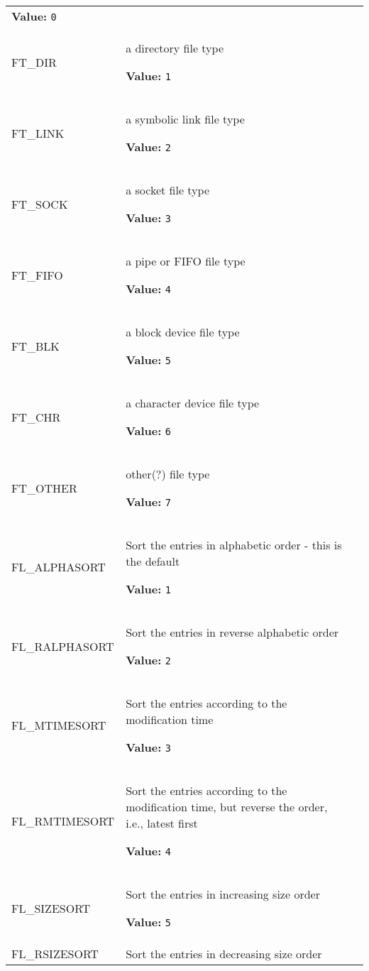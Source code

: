 \begin{longtable}{|p{\varnamewidth}|p{\vardescrwidth}|l}
\textbf{Value:} 
{\tt 0}&\\
\cline{1-2}
\raggedright F\-T\-\_\-D\-I\-R\- & \raggedright a directory file type

\textbf{Value:} 
{\tt 1}&\\
\cline{1-2}
\raggedright F\-T\-\_\-L\-I\-N\-K\- & \raggedright a symbolic link file type

\textbf{Value:} 
{\tt 2}&\\
\cline{1-2}
\raggedright F\-T\-\_\-S\-O\-C\-K\- & \raggedright a socket file type

\textbf{Value:} 
{\tt 3}&\\
\cline{1-2}
\raggedright F\-T\-\_\-F\-I\-F\-O\- & \raggedright a pipe or FIFO file type

\textbf{Value:} 
{\tt 4}&\\
\cline{1-2}
\raggedright F\-T\-\_\-B\-L\-K\- & \raggedright a block device file type

\textbf{Value:} 
{\tt 5}&\\
\cline{1-2}
\raggedright F\-T\-\_\-C\-H\-R\- & \raggedright a character device file type

\textbf{Value:} 
{\tt 6}&\\
\cline{1-2}
\raggedright F\-T\-\_\-O\-T\-H\-E\-R\- & \raggedright other(?) file type

\textbf{Value:} 
{\tt 7}&\\
\cline{1-2}
\raggedright F\-L\-\_\-A\-L\-P\-H\-A\-S\-O\-R\-T\- & \raggedright Sort the entries in alphabetic order - this is the default

\textbf{Value:} 
{\tt 1}&\\
\cline{1-2}
\raggedright F\-L\-\_\-R\-A\-L\-P\-H\-A\-S\-O\-R\-T\- & \raggedright Sort the entries in reverse alphabetic order

\textbf{Value:} 
{\tt 2}&\\
\cline{1-2}
\raggedright F\-L\-\_\-M\-T\-I\-M\-E\-S\-O\-R\-T\- & \raggedright Sort the entries according to the modification time

\textbf{Value:} 
{\tt 3}&\\
\cline{1-2}
\raggedright F\-L\-\_\-R\-M\-T\-I\-M\-E\-S\-O\-R\-T\- & \raggedright Sort the entries according to the modification time, but reverse the
order, i.e., latest first

\textbf{Value:} 
{\tt 4}&\\
\cline{1-2}
\raggedright F\-L\-\_\-S\-I\-Z\-E\-S\-O\-R\-T\- & \raggedright Sort the entries in increasing size order

\textbf{Value:} 
{\tt 5}&\\
\cline{1-2}
\raggedright F\-L\-\_\-R\-S\-I\-Z\-E\-S\-O\-R\-T\- & \raggedright Sort the entries in decreasing size order


\end{longtable}
